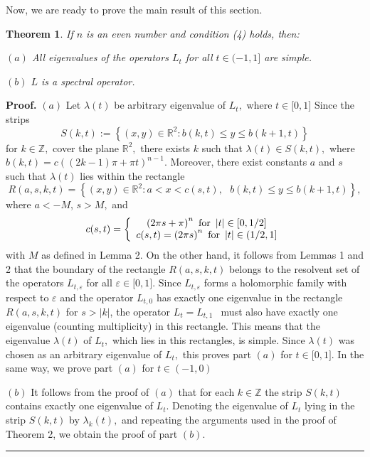\documentclass{article}%
\newtheorem{theorem}{Theorem}
{}
\newenvironment{proof}[1][Proof]{\textbf{#1.} }{\ \rule{0.5em}{0.5em}}
\begin{document}
Now, we are ready to prove the main result of this section.

\begin{theorem}
If $n$ is an even number and condition (4) holds, then:

$(a)$ All eigenvalues of the operators $L_{t}$ for all $t\in(-1,1]$ are simple.

$(b)$ $L$ is a spectral operator.
\end{theorem}

\begin{proof}
$(a)$ Let $\lambda(t)$ be arbitrary eigenvalue of $L_{t},$ where $t\in
\lbrack0,1]$ Since the strips
\[
S(k,t):=\left\{  (x,y)\in\mathbb{R}^{2}:b(k,t)\leq y\leq b(k+1,t)\right\}
\]
for $k\in\mathbb{Z},$ cover the plane $\mathbb{R}^{2},$ there exists $k$ such
that $\lambda(t)\in S(k,t),$ where $b(k,t)=c((2k-1)\pi+\pi t)^{n-1}.$
Moreover, there exist constants $a$ and $s$ such that $\lambda(t)$ lies within
the rectangle
\[
R(a,s,k,t)=\left\{  (x,y)\in\mathbb{R}^{2}:a<x<c(s,t),\text{ }b(k,t)\leq y\leq
b(k+1,t)\right\}  ,
\]
where $a<-M$, $s>M,$ and
\[
c(s,t)=\left\{
\begin{array}
[c]{c}%
\left(  2\pi s+\pi\right)  ^{n}\text{ for }\left\vert t\right\vert \in
\lbrack0,1/2]\\
c(s,t)=\left(  2\pi s\right)  ^{n}\text{ for }\left\vert t\right\vert
\in(1/2,1]
\end{array}
\right.
\]
with $M$ as defined in Lemma 2. On the other hand, it follows from Lemmas 1
and 2 that the boundary of the rectangle $R(a,s,k,t)$ belongs to the resolvent
set of the operators $L_{t,\varepsilon}$ for all $\varepsilon\in\lbrack0,1]$.
Since $L_{t,\varepsilon}$ forms a holomorphic family with respect to
$\varepsilon$ and the operator $L_{t,0}$ has exactly one eigenvalue in the
rectangle $R(a,s,k,t)$ for $s>\left\vert k\right\vert $, the operator
$L_{t}=L_{t,1\text{ }}$ must also have exactly one eigenvalue (counting
multiplicity) in this rectangle. This means that the eigenvalue $\lambda(t)$
of $L_{t},$ which lies in this rectangles, is simple. Since $\lambda(t)$ was
chosen as an arbitrary eigenvalue of $L_{t},$ this proves part $(a)$ for
$t\in\lbrack0,1].$ In the same way, we prove part $(a)$ for $t\in(-1,0)$

$(b)$ It follows from the proof of $(a)$ that for each $k\in\mathbb{Z}$ the
strip $S(k,t)$ contains exactly one eigenvalue of $L_{t}$. Denoting the
eigenvalue of $L_{t}$ lying in the strip $S(k,t)$ by $\lambda_{k}(t),$ and
repeating the arguments used in the proof of Theorem 2, we obtain the proof of
part $(b).$
\end{proof}
\end{document}
